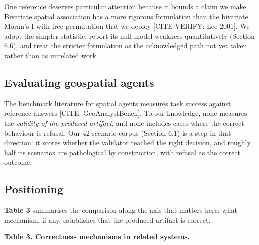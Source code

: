 One reference deserves particular attention because it bounds a claim we make. Bivariate spatial association has a more rigorous formulation than the bivariate Moran's I with free permutation that we deploy [CITE-VERIFY: Lee 2001]. We adopt the simpler statistic, report its null-model weakness quantitatively (Section 6.6), and treat the stricter formulation as the acknowledged path not yet taken rather than as unrelated work.

\subsection{Evaluating geospatial agents}
The benchmark literature for spatial agents measures task success against reference answers \cite{krechetova2025geobenchx} [CITE: GeoAnalystBench]. To our knowledge, none measures the \emph{validity of the produced artifact}, and none includes cases where the correct behaviour is refusal. Our 42-scenario corpus (Section 6.1) is a step in that direction: it scores whether the validator reached the right decision, and roughly half its scenarios are pathological by construction, with refusal as the correct outcome.

\subsection{Positioning}
\textbf{Table 3} summarises the comparison along the axis that matters here: what mechanism, if any, establishes that the produced artifact is correct.

\textbf{Table 3. Correctness mechanisms in related systems.}

